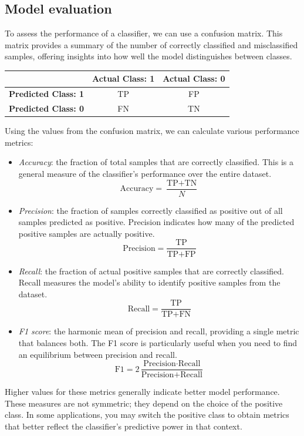 \subsection{Model evaluation}
To assess the performance of a classifier, we can use a confusion matrix. 
This matrix provides a summary of the number of correctly classified and misclassified samples, offering insights into how well the model distinguishes between classes.
\begin{table}[H]
    \centering
    \begin{tabular}{|c|c|c|}
        \hline
        & \textbf{Actual Class: 1} & \textbf{Actual Class: 0} \\ \hline
        \textbf{Predicted Class: 1} & TP & FP \\ \hline
        \textbf{Predicted Class: 0} & FN & TN \\ \hline
    \end{tabular}
\end{table}
Using the values from the confusion matrix, we can calculate various performance metrics:
\begin{itemize}
    \item \textit{Accuracy}: the fraction of total samples that are correctly classified. 
        This is a general measure of the classifier's performance over the entire dataset. 
        \[\text{Accuracy}=\dfrac{\text{TP}+\text{TN}}{N}\]
    \item \textit{Precision}: the fraction of samples correctly classified as positive out of all samples predicted as positive. 
        Precision indicates how many of the predicted positive samples are actually positive.
        \[\text{Precision}=\dfrac{\text{TP}}{\text{TP}+\text{FP}}\]
    \item \textit{Recall}: the fraction of actual positive samples that are correctly classified. 
        Recall measures the model's ability to identify positive samples from the dataset.
        \[\text{Recall}=\dfrac{\text{TP}}{\text{TP}+\text{FN}}\]
    \item \textit{F1 score}: the harmonic mean of precision and recall, providing a single metric that balances both. 
        The F1 score is particularly useful when you need to find an equilibrium between precision and recall.
         \[\text{F1}=2\dfrac{\text{Precision}\cdot\text{Recall}}{\text{Precision}+\text{Recall}}\]
\end{itemize}
Higher values for these metrics generally indicate better model performance.
These measures are not symmetric; they depend on the choice of the positive class. 
In some applications, you may switch the positive class to obtain metrics that better reflect the classifier's predictive power in that context.